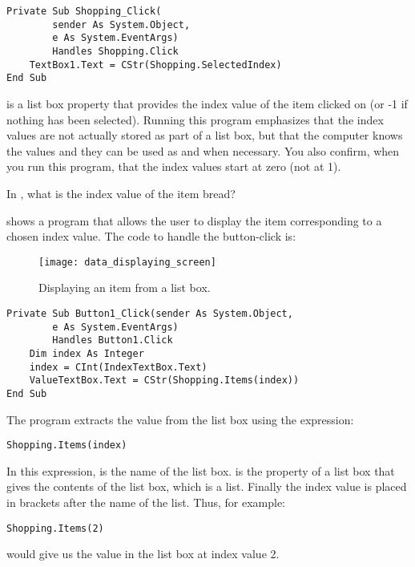 		\begin{lstlisting}
Private Sub Shopping_Click(
		sender As System.Object,
		e As System.EventArgs)
		Handles Shopping.Click
	TextBox1.Text = CStr(Shopping.SelectedIndex)
End Sub
		\end{lstlisting}
		 is a list box property that provides the index value of the item clicked on (or -1 if nothing has been selected). Running this program emphasizes that the index values are not actually stored as part of a list box, but that the computer knows the values and they can be used as and when necessary. You also confirm, when you run this program, that the index values start at zero (not at 1).

		\begin{stqb}
			\begin{STQ}
				\item In , what is the index value of the item bread?
			\end{STQ}
		\end{stqb}
		 shows a program that allows the user to display the item corresponding to a chosen index value. The code to handle the button-click is:
		\begin{figure}[bth]
			\centering
			\texttt{[image: data\_displaying\_screen]}
			\caption{Displaying an item from a list box.}
			\label{fig:data_displaying_screen}
		\end{figure}

		\begin{lstlisting}
Private Sub Button1_Click(sender As System.Object,
		e As System.EventArgs)
		Handles Button1.Click
	Dim index As Integer
	index = CInt(IndexTextBox.Text)
	ValueTextBox.Text = CStr(Shopping.Items(index))
End Sub
		\end{lstlisting}
		The program extracts the value from the list box using the expression:
		\begin{lstlisting}
Shopping.Items(index)
		\end{lstlisting}
		In this expression,  is the name of the list box.  is the property of a list box that gives the contents of the list box, which is a list. Finally the index value is placed in brackets after the name of the list. Thus, for example:
		\begin{lstlisting}
Shopping.Items(2)
		\end{lstlisting}
		would give us the value in the list box at index value 2.
		

